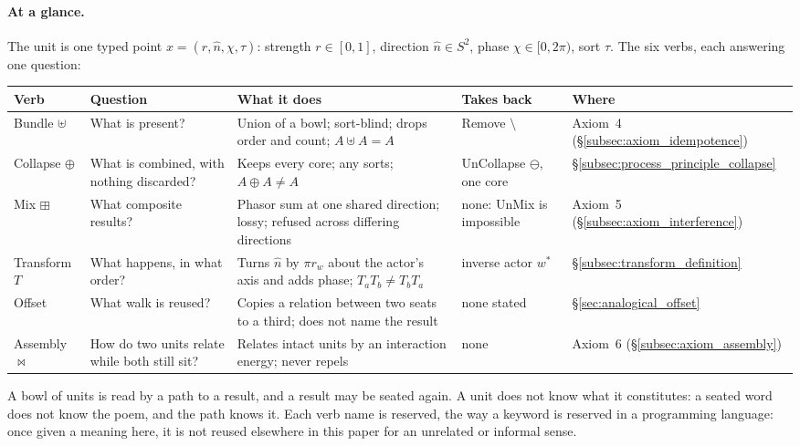 \documentclass[12pt, a4paper]{article}
\begin{document}
\paragraph{At a glance.}
The unit is one typed point $x=(r,\hat n,\chi,\tau)$: strength $r\in[0,1]$, direction $\hat n\in S^2$, phase $\chi\in[0,2\pi)$, sort $\tau$. The six verbs, each answering one question:
\begin{center}
\footnotesize
\begin{tabular}{@{}>{\raggedright\arraybackslash}p{1.9cm}>{\raggedright\arraybackslash}p{2.9cm}>{\raggedright\arraybackslash}p{4.6cm}>{\raggedright\arraybackslash}p{2.5cm}>{\raggedright\arraybackslash}p{2.1cm}@{}}
\hline
Verb & Question & What it does & Takes back & Where \\ \hline
Bundle $\uplus$ & What is present? & Union of a bowl; sort-blind; drops order and count; $A\uplus A=A$ & Remove $\setminus$ & Axiom~4 (\S\ref{subsec:axiom_idempotence}) \\
Collapse $\oplus$ & What is combined, with nothing discarded? & Keeps every core; any sorts; $A\oplus A\ne A$ & UnCollapse $\ominus$, one core & \S\ref{subsec:process_principle_collapse} \\
Mix $\boxplus$ & What composite results? & Phasor sum at one shared direction; lossy; refused across differing directions & none: UnMix is impossible & Axiom~5 (\S\ref{subsec:axiom_interference}) \\
Transform $T$ & What happens, in what order? & Turns $\hat n$ by $\pi r_w$ about the actor's axis and adds phase; $T_aT_b\ne T_bT_a$ & inverse actor $w^{*}$ & \S\ref{subsec:transform_definition} \\
Offset & What walk is reused? & Copies a relation between two seats to a third; does not name the result & none stated & \S\ref{sec:analogical_offset} \\
Assembly $\bowtie$ & How do two units relate while both still sit? & Relates intact units by an interaction energy; never repels & none & Axiom~6 (\S\ref{subsec:axiom_assembly}) \\ \hline
\end{tabular}
\end{center}
A bowl of units is read by a path to a result, and a result may be seated again. A unit does not know what it constitutes: a seated word does not know the poem, and the path knows it. Each verb name is reserved, the way a keyword is reserved in a programming language: once given a meaning here, it is not reused elsewhere in this paper for an unrelated or informal sense.
\end{document}

